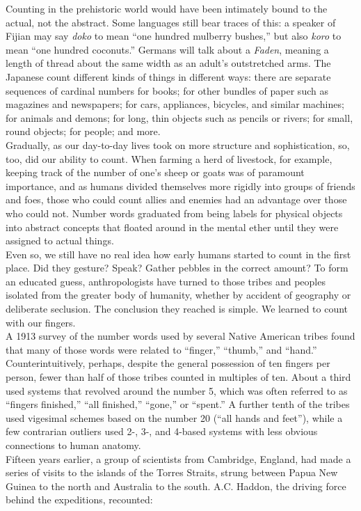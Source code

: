 Counting in the prehistoric world would have been intimately bound to the actual, not the abstract. Some languages still bear traces of this: a speaker of Fijian may say \textit{doko} to mean “one hundred mulberry bushes,” but also \textit{koro} to mean “one hundred coconuts.” Germans will talk about a \textit{Faden}, meaning a length of thread about the same width as an adult’s outstretched arms. The Japanese count different kinds of things in different ways: there are separate sequences of cardinal numbers for books; for other bundles of paper such as magazines and newspapers; for cars, appliances, bicycles, and similar machines; for animals and demons; for long, thin objects such as pencils or rivers; for small, round objects; for people; and more.\\
Gradually, as our day-to-day lives took on more structure and sophistication, so, too, did our ability to count. When farming a herd of livestock, for example, keeping track of the number of one’s sheep or goats was of paramount importance, and as humans divided themselves more rigidly into groups of friends and foes, those who could count allies and enemies had an advantage over those who could not. Number words graduated from being labels for physical objects into abstract concepts that floated around in the mental ether until they were assigned to actual things.\\
Even so, we still have no real idea how early humans started to count in the first place. Did they gesture? Speak? Gather pebbles in the correct amount? To form an educated guess, anthropologists have turned to those tribes and peoples isolated from the greater body of humanity, whether by accident of geography or deliberate seclusion. The conclusion they reached is simple. We learned to count with our fingers.\\
A 1913 survey of the number words used by several Native American tribes found that many of those words were related to “finger,” “thumb,” and “hand.” Counterintuitively, perhaps, despite the general possession of ten fingers per person, fewer than half of those tribes counted in multiples of ten. About a third used systems that revolved around the number 5, which was often referred to as “fingers finished,” “all finished,” “gone,” or “spent.” A further tenth of the tribes used vigesimal schemes based on the number 20 (“all hands and feet”), while a few contrarian outliers used 2-, 3-, and 4-based systems with less obvious connections to human anatomy.\\
Fifteen years earlier, a group of scientists from Cambridge, England, had made a series of visits to the islands of the Torres Straits, strung between Papua New Guinea to the north and Australia to the south. A.C. Haddon, the driving force behind the expeditions, recounted:

